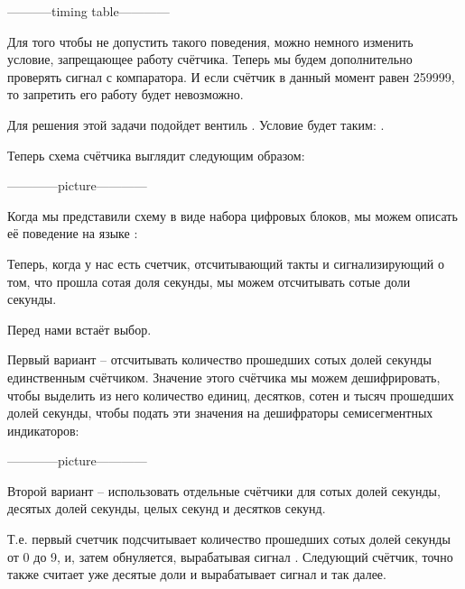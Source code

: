 \par{-----------timing table------------}

\par{Для того чтобы не допустить такого поведения, можно немного изменить условие, запрещающее работу счётчика. Теперь мы будем дополнительно проверять сигнал с компаратора. И если счётчик в данный момент равен 259999, то запретить его работу будет невозможно.}

\par{Для решения этой задачи подойдет вентиль . Условие будет таким: .}

\par{Теперь схема счётчика выглядит следующим образом:}

\par{------------picture------------}

\par{Когда мы представили схему в виде набора цифровых блоков, мы можем описать её поведение на языке :}



\par{Теперь, когда у нас есть счетчик, отсчитывающий такты и сигнализирующий о том, что прошла сотая доля секунды, мы можем отсчитывать сотые доли секунды.}

\par{Перед нами встаёт выбор.}

\par{Первый вариант – отсчитывать количество прошедших сотых долей секунды единственным счётчиком. Значение этого счётчика мы можем дешифрировать, чтобы выделить из него количество единиц, десятков, сотен и тысяч прошедших долей секунды, чтобы подать эти значения на дешифраторы семисегментных индикаторов:}

\par{------------picture------------}

\par{Второй вариант – использовать отдельные счётчики для сотых долей секунды, десятых долей секунды, целых секунд и десятков секунд.}

\par{Т.е. первый счетчик подсчитывает количество прошедших сотых долей секунды от 0 до 9, и, затем обнуляется, вырабатывая сигнал . Следующий счётчик, точно также считает уже десятые доли и вырабатывает сигнал  и так далее.}

